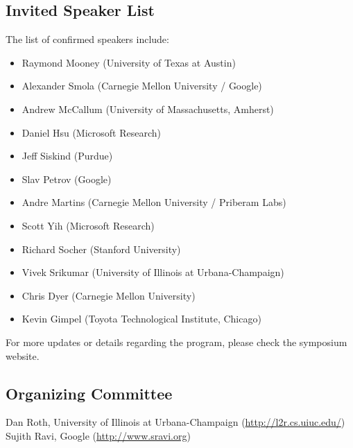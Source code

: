 \subsection*{Invited Speaker List}

The list of confirmed speakers include:
%
\begin{itemize}
\item Raymond Mooney (University of Texas at Austin)
\item Alexander Smola (Carnegie Mellon University / Google)
\item Andrew McCallum (University of Massachusetts, Amherst)
\item Daniel Hsu (Microsoft Research)
\item Jeff Siskind (Purdue)
\item Slav Petrov (Google)
\item Andre Martins (Carnegie Mellon University / Priberam Labs)
\item Scott Yih (Microsoft Research)
\item Richard Socher (Stanford University)
\item Vivek Srikumar (University of Illinois at Urbana-Champaign)
\item Chris Dyer (Carnegie Mellon University)
\item Kevin Gimpel (Toyota Technological Institute, Chicago)
\end{itemize}

For more updates or details regarding the program, please check the symposium website.

\subsection*{Organizing Committee}
%
\noindent Dan Roth, University of Illinois at Urbana-Champaign (\url{http://l2r.cs.uiuc.edu/}) \\
\noindent Sujith Ravi, Google (\url{http://www.sravi.org})
